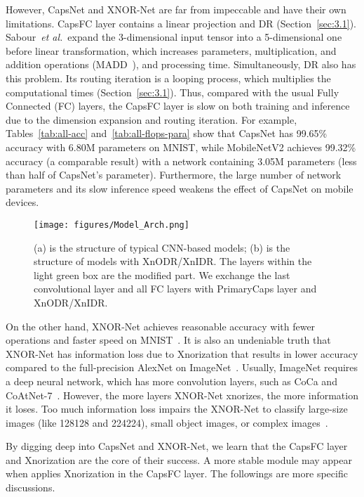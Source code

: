 \documentclass[sn-mathphys,iicol,Numbered]{sn-jnl}
\newcommand{\etal}{\textit{et al.}}
\begin{document}
However, CapsNet and XNOR-Net are far from impeccable and have their own limitations. CapsFC layer contains a linear projection and DR (Section~\ref{sec:3.1}). Sabour~\etal~expand the 3-dimensional input tensor into a 5-dimensional one before linear transformation, which increases parameters, multiplication, and addition operations (MADD~\cite{A18_MBV2}), and processing time. Simultaneously, DR also has this problem. Its routing iteration is a looping process, which multiplies the computational times (Section~\ref{sec:3.1}). Thus, compared with the usual Fully Connected (FC) layers, the CapsFC layer is slow on both training and inference due to the dimension expansion and routing iteration. For example, Tables~\ref{tab:all-acc} and~\ref{tab:all-flops-para} show that CapsNet has 99.65\% accuracy with 6.80M parameters on MNIST, while MobileNetV2 achieves 99.32\% accuracy (a comparable result) with a network containing 3.05M parameters (less than half of CapsNet's parameter). Furthermore, the large number of network parameters and its slow inference speed weakens the effect of CapsNet on mobile devices.

\begin{figure*}[t]
\begin{center}
\texttt{[image: figures/Model\_Arch.png]}
\end{center}
   \caption{(a) is the structure of typical CNN-based models; (b) is the structure of models with XnODR/XnIDR. The layers within the light green box are the modified part. We exchange the last convolutional layer and all FC layers with PrimaryCaps layer and XnODR/XnIDR.}
\label{fig:m-struct}
\end{figure*}



On the other hand, XNOR-Net achieves reasonable accuracy with fewer operations and faster speed on MNIST~\cite{A2_xnor}. It is also an undeniable truth that XNOR-Net has information loss due to Xnorization that results in lower accuracy compared to the full-precision AlexNet on ImageNet~\cite{A2_xnor, A48_img_net}. Usually, ImageNet requires a deep neural network, which has more convolution layers, such as CoCa and CoAtNet-7~\cite{A73_Coca, A72_CoAtNet}. However, the more layers XNOR-Net xnorizes, the more information it loses. Too much information loss impairs the XNOR-Net to classify large-size images (like 128128 and 224224), small object images, or complex images~\cite{A2_xnor}.

By digging deep into CapsNet and XNOR-Net, we learn that the CapsFC layer and Xnorization are the core of their success. A more stable module may appear when applies Xnorization in the CapsFC layer. The followings are more specific discussions.
\end{document}
